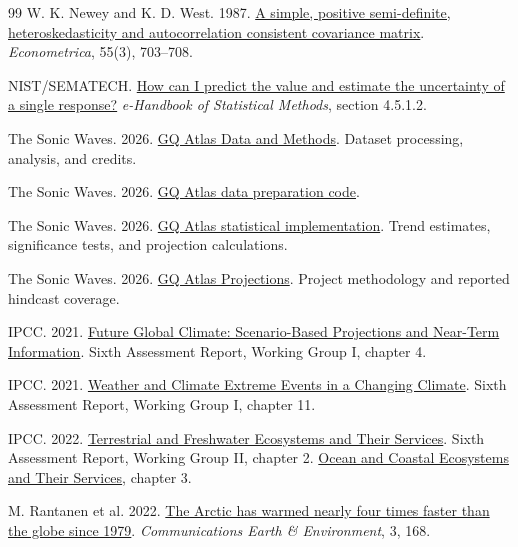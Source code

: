 \documentclass[11pt,letterpaper]{article}
\begin{document}
\begin{thebibliography}{99}
 W. K. Newey and K. D. West. 1987.
\href{https://doi.org/10.2307/1913610}{A simple, positive semi-definite, heteroskedasticity and autocorrelation consistent covariance matrix}. \textit{Econometrica}, 55(3), 703--708.

 NIST/SEMATECH.
\href{https://itl.nist.gov/div898/handbook/pmd/section5/pmd512.htm}{How can I predict the value and estimate the uncertainty of a single response?} \textit{e-Handbook of Statistical Methods}, section 4.5.1.2.

 The Sonic Waves. 2026.
\href{https://gqatlas.vercel.app/data-and-methods/}{GQ Atlas Data and Methods}. Dataset processing, analysis, and credits.

 The Sonic Waves. 2026.
\href{https://github.com/advayc/space-apps/blob/88e7cdf/scripts/prepare_data.py}{GQ Atlas data preparation code}.

 The Sonic Waves. 2026.
\href{https://github.com/advayc/space-apps/blob/88e7cdf/dist/statistics.js}{GQ Atlas statistical implementation}. Trend estimates, significance tests, and projection calculations.

 The Sonic Waves. 2026.
\href{https://gqatlas.vercel.app/projections/}{GQ Atlas Projections}. Project methodology and reported hindcast coverage.

 IPCC. 2021.
\href{https://www.ipcc.ch/report/ar6/wg1/chapter/chapter-4/}{Future Global Climate: Scenario-Based Projections and Near-Term Information}. Sixth Assessment Report, Working Group I, chapter 4.

 IPCC. 2021.
\href{https://www.ipcc.ch/report/ar6/wg1/chapter/chapter-11/}{Weather and Climate Extreme Events in a Changing Climate}. Sixth Assessment Report, Working Group I, chapter 11.

 IPCC. 2022.
\href{https://www.ipcc.ch/report/ar6/wg2/chapter/chapter-2/}{Terrestrial and Freshwater Ecosystems and Their Services}. Sixth Assessment Report, Working Group II, chapter 2.
\href{https://www.ipcc.ch/report/ar6/wg2/chapter/chapter-3/}{Ocean and Coastal Ecosystems and Their Services}, chapter 3.

 M. Rantanen et al. 2022.
\href{https://doi.org/10.1038/s43247-022-00498-3}{The Arctic has warmed nearly four times faster than the globe since 1979}. \textit{Communications Earth \& Environment}, 3, 168.


\end{thebibliography}
\end{document}
